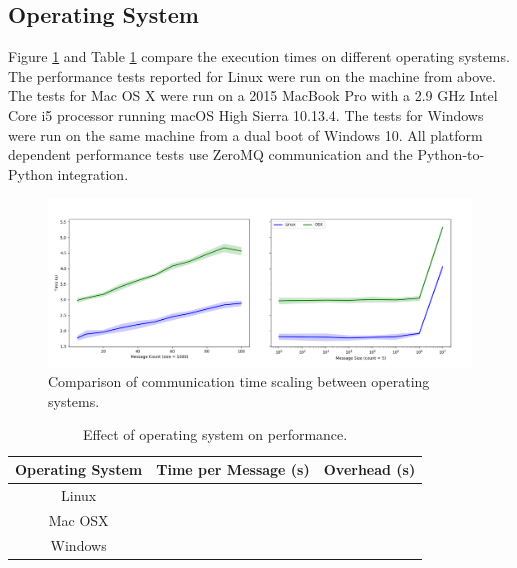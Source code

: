 \documentclass[journal]{IEEEtran}
\newcommand{\todo}[1]{{\color{red}{#1}}}
\begin{document}
\subsection{Operating System}\label{SS:results_platform}
%
Figure \ref{fig:platform} and Table \ref{tab:platform} compare the execution times on different operating systems. The performance tests reported for Linux were run on the machine from above. The tests for Mac OS X were run on a 2015 MacBook Pro with a 2.9 GHz Intel Core i5 processor running macOS High Sierra 10.13.4. The tests for Windows were run on the same machine from a dual boot of Windows 10. All platform dependent performance tests use ZeroMQ communication and the Python-to-Python integration.
%
\ifinclfig
 	\begin{figure}[htbp]
	\begin{center}
	\includegraphics[width=\columnwidth,keepaspectratio]{./images/scaling_platform.png}
	\caption{Comparison of communication time scaling between operating systems.}
	\label{fig:platform}
	\end{center}
	\end{figure}
\fi
%
\begin{table}[htbp]
\begin{center}
\begin{tabular}{|c|c|c|}
\hline
Operating System	& Time per Message (s) 	& Overhead (s) 	\\\hline
Linux			& \todo{?}				& \todo{?}			\\
Mac OSX			& \todo{?}				& \todo{?}			\\
Windows			& \todo{?}				& \todo{?}			\\\hline
\end{tabular}
\end{center}
\caption{Effect of operating system on performance.}
\label{tab:platform}
\end{table}%
%
\todo{Windows results \& discussion}

\end{document}

